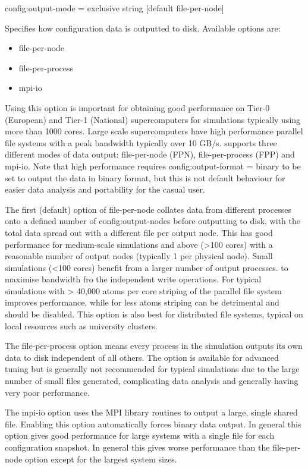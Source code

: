 {\zicf config:output-mode = exclusive string [default file-per-node]}
Specifies how configuration data is outputted to disk. Available options are:

\begin{itemize}
  \item[] file-per-node
  \item[] file-per-process
  \item[] mpi-io
\end{itemize}

Using this option is important for obtaining good performance on Tier-0 (European) and Tier-1 (National) supercomputers for simulations typically using more than 1000 cores. Large scale supercomputers have high performance parallel file systems with a peak bandwidth typically over 10 GB/s. \vampire supports three different modes of data output: file-per-node (FPN), file-per-process (FPP) and mpi-io. Note that high performance requires
config:output-format = binary to be set to output the data in binary format, but this is not default behaviour for easier data analysis and portability for the casual user.

The first (default) option of file-per-node collates data from different processes onto a defined number of config:output-nodes before
outputting to disk, with the total data spread out with a different file per output node. This has good performance for medium-scale simulations and above (>100 cores) with a reasonable number of output nodes (typically 1 per physical node). Small simulations (<100 cores) benefit from a larger number of output processes. to maximise bandwidth fro the independent write operations. For typical simulations with > 40,000 atoms per core striping of the parallel file system improves performance, while for less atoms striping can be detrimental and should be disabled. This option is also best for distributed file systems, typical on local resources such as university clusters.

The file-per-process option means every process in the simulation outputs its own data to disk independent of all others. The option is available for advanced tuning but is generally not recommended for typical simulations due to the large number of small files generated, complicating data analysis and generally having very poor performance.

The mpi-io option uses the MPI library routines to output a large, single shared file. Enabling this option automatically forces binary data output. In general this option gives good performance for large systems with a single file for each configuration snapshot. In general this gives worse performance than the file-per-node option except for the largest system sizes.

